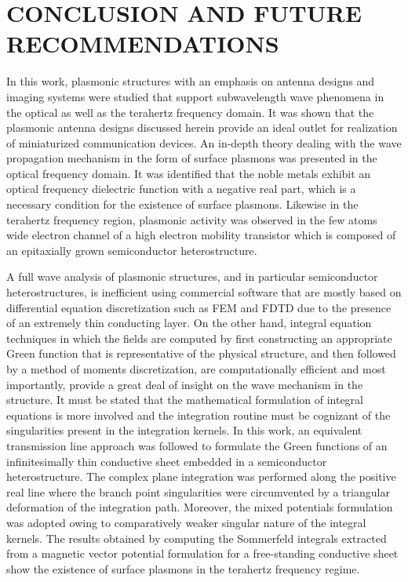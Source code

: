 \chapter{\uppercase {Conclusion and Future recommendations}}

In this work, plasmonic structures with an emphasis on antenna designs and imaging systems were studied that support subwavelength wave phenomena in the optical as well as the terahertz frequency domain. It was shown that the plasmonic antenna designs discussed herein provide an ideal outlet for realization of miniaturized communication devices. An in-depth theory dealing with the wave propagation mechanism in the form of surface plasmons was presented in the optical frequency domain. It was identified that the noble metals exhibit an optical frequency dielectric function with a negative real part, which is a necessary condition for the existence of surface plasmons. Likewise in the terahertz frequency region, plasmonic activity was observed in the few atoms wide electron channel of a high electron mobility transistor which is composed of an epitaxially grown semiconductor heterostructure.

A full wave analysis of plasmonic structures, and in particular semiconductor heterostructures, is inefficient using commercial software that are mostly based on differential equation discretization such as FEM and FDTD due to the presence of an extremely thin conducting layer. On the other hand, integral equation techniques in which the fields are computed by first constructing an appropriate Green function that is representative of the physical structure, and then followed by a method of moments discretization, are computationally efficient and most importantly, provide a great deal of insight on the wave mechanism in the structure. It must be stated that the mathematical formulation of integral equations is more involved and the integration routine must be cognizant of the singularities present in the integration kernels. In this work, an equivalent transmission line approach was followed to formulate the Green functions of an infinitesimally thin conductive sheet embedded in a semiconductor heterostructure. The complex plane integration was performed along the positive real line where the branch point singularities were circumvented by a triangular deformation of the integration path. Moreover, the mixed potentials formulation was adopted owing to comparatively weaker singular nature of the integral kernels. The results obtained by computing the  Sommerfeld integrals extracted from a magnetic vector potential formulation  for a free-standing conductive sheet show the existence of surface plasmons in the terahertz frequency regime.

